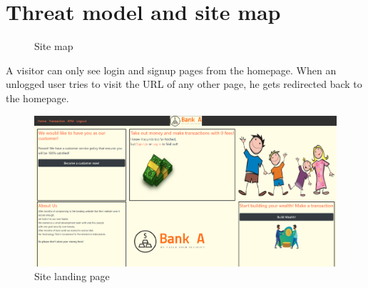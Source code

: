\renewcommand{\chaptername}{Chapter}
\renewcommand{\figurename}{Fig.}
\chapter{Threat model and site map}\label{kap:Threat model and site map}
\begin{figure}[H]
    \centering
    \caption{Site map}
    \label{fig:cha1fig1sitemap}
\end{figure}

A visitor can only see login and signup pages from the homepage. When an unlogged user tries to visit the URL of any other page, he gets redirected back to the homepage.

\begin{figure}[H]
    \centering
    \includegraphics[width=\textwidth]{pics/pic2 home visitor.PNG}
    \caption{Site landing page}
    \label{fig:cha1fig2landingpage}
\end{figure}

